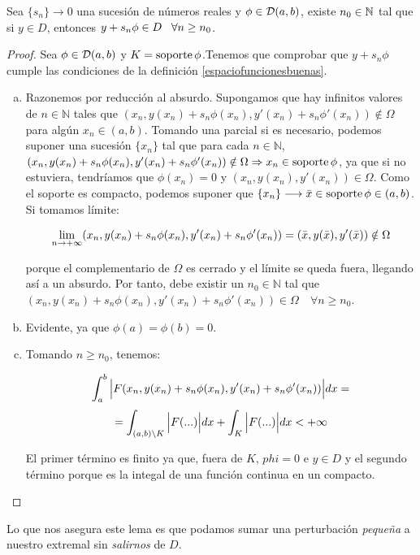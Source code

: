 \begin{lemma}
\label{lemmatecnico}
Sea $\{s_n\}\longrightarrow 0$ una sucesión de números reales y $\phi\in \mathcal{D}(a,b)$, existe $n_0\in\mathbb{N}$ tal que si $y\in D$, entonces $y+s_n\phi\in D \;\;\; \forall n\geq n_0$.
\end{lemma}
\begin{proof}

Sea $\phi\in\mathcal{D}(a,b)$ y $K=\operatorname{soporte}\phi$.Tenemos que comprobar que $y+s_n\phi$ cumple las condiciones de la definición \ref{espaciofuncionesbuenas}.

\begin{enumerate}[(a)]
\item Razonemos por reducción al absurdo. Supongamos que hay infinitos valores de $n\in\mathbb{N}$ tales que $(x_n,y(x_n)+s_n\phi(x_n),y'(x_n)+s_n\phi'(x_n))\notin \Omega$ para algún $x_n\in(a,b)$. Tomando una parcial si es necesario, podemos suponer una sucesión $\{x_n\}$ tal que para cada $n\in\mathbb{N}$, $(x_n,y(x_n)+s_n\phi(x_n),y'(x_n)+s_n\phi'(x_n))\notin \Omega \Rightarrow x_n\in\operatorname{soporte}\phi$, ya que si no estuviera, tendríamos que $\phi(x_n)=0$ y $(x_n,y(x_n),y'(x_n))\in \Omega$. Como el soporte es compacto, podemos suponer que $\{x_n\}\longrightarrow\bar{x}\in\operatorname{soporte}\phi\in(a,b)$. Si tomamos límite:

\[
\displaystyle\lim_{  n  \to +\infty }  (x_n,y(x_n)+s_n\phi(x_n),y'(x_n)+s_n\phi'(x_n)) =(\bar{x},y(\bar{x}),y'(\bar{x}))\notin\Omega 
\]

porque el complementario de $\Omega$ es cerrado y el límite se queda fuera, llegando así a un absurdo. Por tanto, debe existir un $n_0\in\mathbb{N}$ tal que $(x_n,y(x_n)+s_n\phi(x_n),y'(x_n)+s_n\phi'(x_n))\in \Omega\quad\forall n\geq n_0$.
\item Evidente, ya que $\phi(a)=\phi(b)=0$.
\item Tomando $n\geq n_0$, tenemos:

\[\displaystyle\int_{ a }^{ b } \Big|F(x_n,y(x_n)+s_n\phi(x_n),y'(x_n)+s_n\phi'(x_n))\Big|dx=\]
\[
=\displaystyle\int_{ (a,b)\backslash K }^{  } \Big|F(...)\Big|dx+\displaystyle\int_{ K }^{  } \Big|F(...)\Big|dx < +\infty
\]

El primer término es finito ya que, fuera de $K$, $phi=0$ e $y\in D$ y el segundo término porque es la integal de una función continua en un compacto. 
\end{enumerate}
\end{proof}
Lo que nos asegura este lema es que podamos sumar una perturbación \textit{pequeña} a nuestro extremal sin \textit{salirnos} de $D$.

